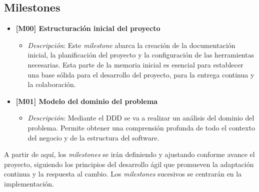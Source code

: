 \subsection{Milestones}

\begin{itemize}
    \item \textbf{[M00] \- Estructuración inicial del proyecto}
    \begin{itemize}
        \item \textit{Descripción}: Este \textit{milestone} abarca la creación de la documentación inicial, la planificación del proyecto y la configuración de las herramientas necesarias. Esta parte de la memoria inicial es esencial para establecer una base sólida para el desarrollo del proyecto, para la entrega continua y la colaboración.
    \end{itemize}

    \item \textbf{[M01] \- Modelo del dominio del problema}
    \begin{itemize}
        \item \textit{Descripción}: Mediante el DDD se va a realizar un análisis del dominio del problema. Permite obtener una comprensión profunda de todo el contexto del negocio y de la estructura del software.
    \end{itemize}
\end{itemize}

A partir de aquí, los \textit{milestones} se irán definiendo y ajustando conforme avance el proyecto, siguiendo los principios del desarrollo ágil que promueven la adaptación continua y la respuesta al cambio. Los \textit{milestones} sucesivos se centrarán en la implementación.